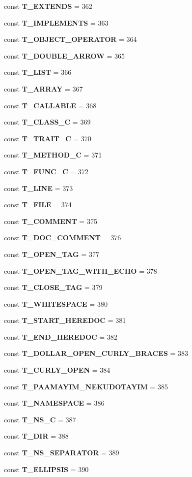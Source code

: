 \begin{DoxyCompactItemize}
\item 
const {\bf T\+\_\+\+E\+X\+T\+E\+N\+D\+S} = 362
\item 
const {\bf T\+\_\+\+I\+M\+P\+L\+E\+M\+E\+N\+T\+S} = 363
\item 
const {\bf T\+\_\+\+O\+B\+J\+E\+C\+T\+\_\+\+O\+P\+E\+R\+A\+T\+O\+R} = 364
\item 
const {\bf T\+\_\+\+D\+O\+U\+B\+L\+E\+\_\+\+A\+R\+R\+O\+W} = 365
\item 
const {\bf T\+\_\+\+L\+I\+S\+T} = 366
\item 
const {\bf T\+\_\+\+A\+R\+R\+A\+Y} = 367
\item 
const {\bf T\+\_\+\+C\+A\+L\+L\+A\+B\+L\+E} = 368
\item 
const {\bf T\+\_\+\+C\+L\+A\+S\+S\+\_\+\+C} = 369
\item 
const {\bf T\+\_\+\+T\+R\+A\+I\+T\+\_\+\+C} = 370
\item 
const {\bf T\+\_\+\+M\+E\+T\+H\+O\+D\+\_\+\+C} = 371
\item 
const {\bf T\+\_\+\+F\+U\+N\+C\+\_\+\+C} = 372
\item 
const {\bf T\+\_\+\+L\+I\+N\+E} = 373
\item 
const {\bf T\+\_\+\+F\+I\+L\+E} = 374
\item 
const {\bf T\+\_\+\+C\+O\+M\+M\+E\+N\+T} = 375
\item 
const {\bf T\+\_\+\+D\+O\+C\+\_\+\+C\+O\+M\+M\+E\+N\+T} = 376
\item 
const {\bf T\+\_\+\+O\+P\+E\+N\+\_\+\+T\+A\+G} = 377
\item 
const {\bf T\+\_\+\+O\+P\+E\+N\+\_\+\+T\+A\+G\+\_\+\+W\+I\+T\+H\+\_\+\+E\+C\+H\+O} = 378
\item 
const {\bf T\+\_\+\+C\+L\+O\+S\+E\+\_\+\+T\+A\+G} = 379
\item 
const {\bf T\+\_\+\+W\+H\+I\+T\+E\+S\+P\+A\+C\+E} = 380
\item 
const {\bf T\+\_\+\+S\+T\+A\+R\+T\+\_\+\+H\+E\+R\+E\+D\+O\+C} = 381
\item 
const {\bf T\+\_\+\+E\+N\+D\+\_\+\+H\+E\+R\+E\+D\+O\+C} = 382
\item 
const {\bf T\+\_\+\+D\+O\+L\+L\+A\+R\+\_\+\+O\+P\+E\+N\+\_\+\+C\+U\+R\+L\+Y\+\_\+\+B\+R\+A\+C\+E\+S} = 383
\item 
const {\bf T\+\_\+\+C\+U\+R\+L\+Y\+\_\+\+O\+P\+E\+N} = 384
\item 
const {\bf T\+\_\+\+P\+A\+A\+M\+A\+Y\+I\+M\+\_\+\+N\+E\+K\+U\+D\+O\+T\+A\+Y\+I\+M} = 385
\item 
const {\bf T\+\_\+\+N\+A\+M\+E\+S\+P\+A\+C\+E} = 386
\item 
const {\bf T\+\_\+\+N\+S\+\_\+\+C} = 387
\item 
const {\bf T\+\_\+\+D\+I\+R} = 388
\item 
const {\bf T\+\_\+\+N\+S\+\_\+\+S\+E\+P\+A\+R\+A\+T\+O\+R} = 389
\item 
const {\bf T\+\_\+\+E\+L\+L\+I\+P\+S\+I\+S} = 390
\end{DoxyCompactItemize}
